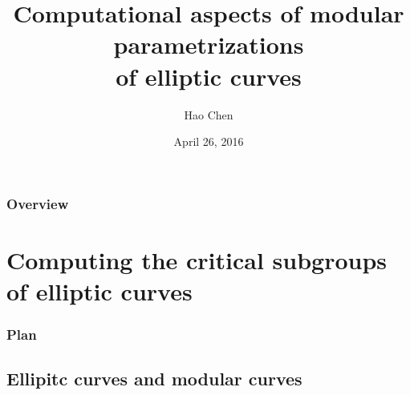 \documentclass[handout]{beamer}
\title[thesis defense]{Computational aspects of modular parametrizations \\ of elliptic curves} %
\author{Hao Chen} %
\institute[UW] %
{
University of Washington Ph.D. defense \\ %
\medskip
Advisor: William Stein %
}
\date{April 26, 2016} %
\begin{document}
\begin{frame}
\titlepage %
\end{frame}

%
\begin{frame}
\frametitle{Overview} %
\huge \tableofcontents[hideallsubsections] %
\end{frame}



\section{Computing the critical subgroups of elliptic curves} %

 \begin{frame}
 \frametitle{Plan}
 \tableofcontents[currentsection]
 \end{frame}

\subsection{Ellipitc curves and modular curves}
\end{document}
